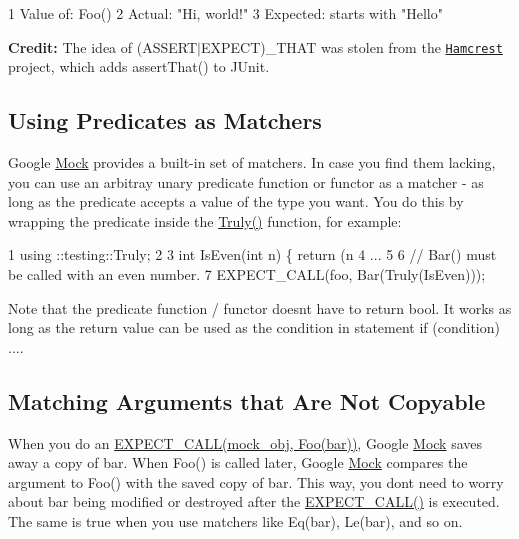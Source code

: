 \begin{DoxyCode}
1 Value of: Foo()
2   Actual: "Hi, world!"
3 Expected: starts with "Hello"
\end{DoxyCode}


{\bfseries Credit\+:} The idea of {\ttfamily (A\+S\+S\+E\+R\+T$\vert$\+E\+X\+P\+E\+CT)\+\_\+\+T\+H\+AT} was stolen from the \href{http://code.google.com/p/hamcrest/}{\tt Hamcrest} project, which adds {\ttfamily assert\+That()} to J\+Unit.

\subsection*{Using Predicates as Matchers}

Google \hyperlink{class_mock}{Mock} provides a built-\/in set of matchers. In case you find them lacking, you can use an arbitray unary predicate function or functor as a matcher -\/ as long as the predicate accepts a value of the type you want. You do this by wrapping the predicate inside the {\ttfamily \hyperlink{namespacetesting_a5faf05cfaae6074439960048e478b1c8}{Truly()}} function, for example\+:


\begin{DoxyCode}
1 using ::testing::Truly;
2 
3 int IsEven(int n) \{ return (n %
4 ...
5 
6   // Bar() must be called with an even number.
7   EXPECT\_CALL(foo, Bar(Truly(IsEven)));
\end{DoxyCode}


Note that the predicate function / functor doesn\textquotesingle{}t have to return {\ttfamily bool}. It works as long as the return value can be used as the condition in statement {\ttfamily if (condition) ...}.

\subsection*{Matching Arguments that Are Not Copyable}

When you do an {\ttfamily \hyperlink{gmock-spec-builders_8h_a535a6156de72c1a2e25a127e38ee5232}{E\+X\+P\+E\+C\+T\+\_\+\+C\+A\+L\+L(mock\+\_\+obj, Foo(bar))}}, Google \hyperlink{class_mock}{Mock} saves away a copy of {\ttfamily bar}. When {\ttfamily Foo()} is called later, Google \hyperlink{class_mock}{Mock} compares the argument to {\ttfamily Foo()} with the saved copy of {\ttfamily bar}. This way, you don\textquotesingle{}t need to worry about {\ttfamily bar} being modified or destroyed after the {\ttfamily \hyperlink{gmock-spec-builders_8h_a535a6156de72c1a2e25a127e38ee5232}{E\+X\+P\+E\+C\+T\+\_\+\+C\+A\+L\+L()}} is executed. The same is true when you use matchers like {\ttfamily Eq(bar)}, {\ttfamily Le(bar)}, and so on.

